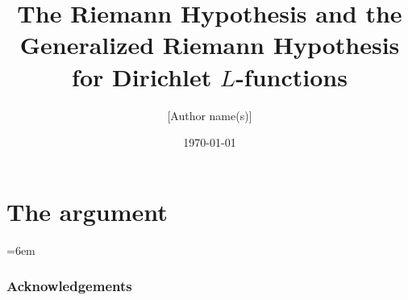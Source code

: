 \documentclass[11pt]{amsart}
\title[GRH for Dirichlet $L$-functions]{The Riemann Hypothesis and the Generalized Riemann Hypothesis\\
for Dirichlet $L$-functions}
\author{[Author name(s)]}
\date{\today}
\begin{document}
\begin{abstract}

\end{abstract}

\maketitle
\setcounter{tocdepth}{1}
\tableofcontents

\part{The argument}\label{part:argument}















\relax\emergencystretch=6em\relax


























































\appendix



\section*{Acknowledgements}




\end{document}
